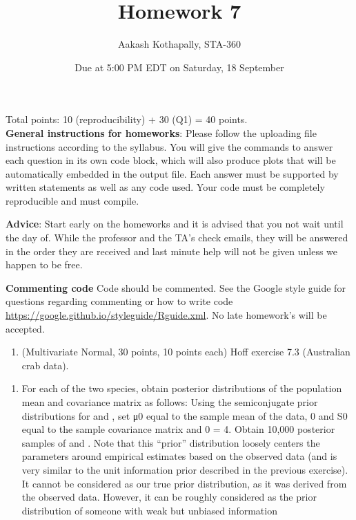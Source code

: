 \documentclass[
]{article}
\title{Homework 7}
\author{Aakash Kothapally, STA-360}
\date{Due at 5:00 PM EDT on Saturday, 18 September}
\providecommand{\tightlist}{%
  \setlength{\itemsep}{0pt}\setlength{\parskip}{0pt}}
\begin{document}
\maketitle

Total points: 10 (reproducibility) + 30 (Q1) = 40 points.\\

\textbf{General instructions for homeworks}: Please follow the uploading
file instructions according to the syllabus. You will give the commands
to answer each question in its own code block, which will also produce
plots that will be automatically embedded in the output file. Each
answer must be supported by written statements as well as any code used.
Your code must be completely reproducible and must compile.

\textbf{Advice}: Start early on the homeworks and it is advised that you
not wait until the day of. While the professor and the TA's check
emails, they will be answered in the order they are received and last
minute help will not be given unless we happen to be free.

\textbf{Commenting code} Code should be commented. See the Google style
guide for questions regarding commenting or how to write code
\url{https://google.github.io/styleguide/Rguide.xml}. No late homework's
will be accepted.

\begin{enumerate}
\def\labelenumi{\arabic{enumi}.}
\tightlist
\item
  (Multivariate Normal, 30 points, 10 points each) Hoff exercise 7.3
  (Australian crab data).
\end{enumerate}

\begin{enumerate}
\def\labelenumi{\alph{enumi}.}
\tightlist
\item
  For each of the two species, obtain posterior distributions of the
  population mean \theta and covariance matrix \sigma as follows: Using
  the semiconjugate prior distributions for \theta and \sigma, set μ0
  equal to the sample mean of the data, 0 and S0 equal to the sample
  covariance matrix and 0 = 4. Obtain 10,000 posterior samples of and .
  Note that this ``prior'' distribution loosely centers the parameters
  around empirical estimates based on the observed data (and is very
  similar to the unit information prior described in the previous
  exercise). It cannot be considered as our true prior distribution, as
  it was derived from the observed data. However, it can be roughly
  considered as the prior distribution of someone with weak but unbiased
  information
\end{enumerate}
\end{document}
